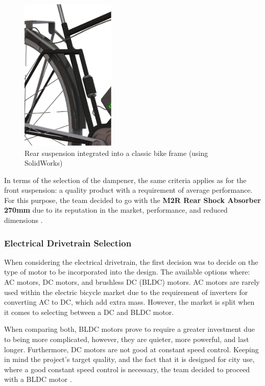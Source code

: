 \documentclass[a4paper,11pt]{article}
\begin{document}
\begin{figure}[ht]
	\centering
	\includegraphics[width=0.4\textwidth]{ourhor}
	\caption{Rear suspension integrated into a classic bike frame (using SolidWorks)}
	\label{fig:ourhor}
\end{figure}

\newpage

In terms of the selection of the dampener, the same criteria applies as for the front suspension: a quality product with a requirement of average performance. For this purpose, the team decided to go with the \textbf{M2R Rear Shock Absorber 270mm} due to its reputation in the market, performance, and reduced dimensions \cite{m2r}. 

\subsubsection{Electrical Drivetrain Selection}

When considering the electrical drivetrain, the first decision was to decide on the type of motor to be incorporated into the design. The available options where: AC motors, DC motors, and brushless DC (BLDC) motors. AC motors are rarely used within the electric bicycle market due to the requirement of inverters for converting AC to DC, which add extra mass. However, the market is split when it comes to selecting between a DC and BLDC motor. 

When comparing both, BLDC motors prove to require a greater investment due to being more complicated, however, they are quieter, more powerful, and last longer. Furthermore, DC motors are not good at constant speed control. Keeping in mind the project's target quality, and the fact that it is designed for city use, where a good constant speed control is necessary, the team decided to proceed with a BLDC motor \cite{rag14}. 
\end{document}
